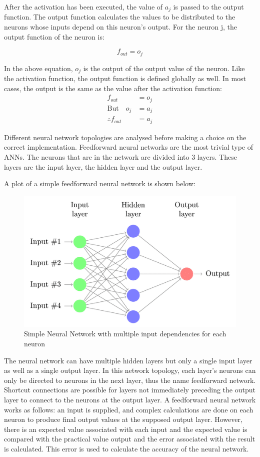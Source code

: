 After the activation has been executed, the value of  $a_j$ is passed to the output function. The output function calculates the values to be distributed to the neurons whose inputs depend on this neuron’s output. For the neuron j, the output function of the neuron is:

\begin{equation}
	f_{out}=o_j	
\end{equation}

In the above equation, $o_j$ is the output of the output value of the neuron. Like the activation function, the output function is defined globally as well. In most cases, the output is the same as the value after the activation function:
\begin{align}
		f_{out}&=o_j \nonumber\\
	\text{But}\quad o_j&=a_j \nonumber\\
	\therefore f_{out}&=a_j
\end{align}

Different neural network topologies are analysed before making a choice on the correct implementation. Feedforward neural networks are the most trivial type of ANNs. The neurons that are in the network are divided into 3 layers. These layers are the input layer, the hidden layer and the output layer.

A plot of a simple feedforward neural network is shown below:
\begin{figure}[h]
	\centering
	\includegraphics[scale=0.6]{11}
	\caption{Simple Neural Network with multiple input dependencies for each neuron}
\end{figure}

The neural network can have multiple hidden layers but only a single input layer as well as a single output layer. In this network topology, each layer’s neurons can only be directed to neurons in the next layer, thus the name feedforward network. Shortcut connections are possible for layers not immediately preceding the output layer to connect to the neurons at the output layer. A feedforward neural network works as follows: an input is supplied, and complex calculations are done on each neuron to produce final output values at the supposed output layer. However, there is an expected value associated with each input and the expected value is compared with the practical value output and the error associated with the result is calculated. This error is used to calculate the accuracy of the neural network.

